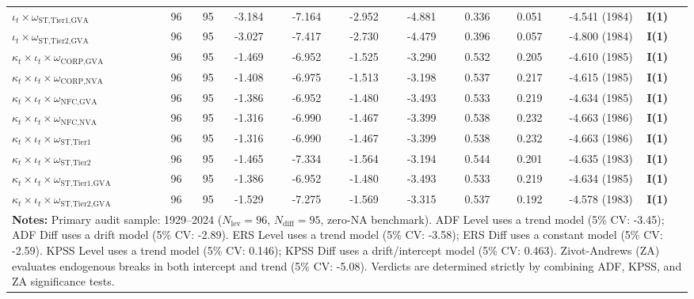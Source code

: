 \documentclass[11pt,a4paper]{article}
\begin{document}
\begin{landscape}
\begin{table}[p]
\begin{tabular}{p{6.0cm} p{0.6cm} p{0.6cm} p{1.5cm} p{1.5cm} p{1.5cm} p{1.5cm} p{1.5cm} p{1.5cm} p{2.2cm} p{2.2cm}}
$\iota_t \times \omega_{\text{ST,Tier1,GVA}}$ & 96 & 95 & -3.184 & -7.164 & -2.952 & -4.881 & 0.336 & 0.051 & -4.541 (1984) & \textbf{I(1)} \\
$\iota_t \times \omega_{\text{ST,Tier2,GVA}}$ & 96 & 95 & -3.027 & -7.417 & -2.730 & -4.479 & 0.396 & 0.057 & -4.800 (1984) & \textbf{I(1)} \\
$\kappa_t \times \iota_t \times \omega_{\text{CORP,GVA}}$ & 96 & 95 & -1.469 & -6.952 & -1.525 & -3.290 & 0.532 & 0.205 & -4.610 (1985) & \textbf{I(1)} \\
$\kappa_t \times \iota_t \times \omega_{\text{CORP,NVA}}$ & 96 & 95 & -1.408 & -6.975 & -1.513 & -3.198 & 0.537 & 0.217 & -4.615 (1985) & \textbf{I(1)} \\
$\kappa_t \times \iota_t \times \omega_{\text{NFC,GVA}}$ & 96 & 95 & -1.386 & -6.952 & -1.480 & -3.493 & 0.533 & 0.219 & -4.634 (1985) & \textbf{I(1)} \\
$\kappa_t \times \iota_t \times \omega_{\text{NFC,NVA}}$ & 96 & 95 & -1.316 & -6.990 & -1.467 & -3.399 & 0.538 & 0.232 & -4.663 (1986) & \textbf{I(1)} \\
$\kappa_t \times \iota_t \times \omega_{\text{ST,Tier1}}$ & 96 & 95 & -1.316 & -6.990 & -1.467 & -3.399 & 0.538 & 0.232 & -4.663 (1986) & \textbf{I(1)} \\
$\kappa_t \times \iota_t \times \omega_{\text{ST,Tier2}}$ & 96 & 95 & -1.465 & -7.334 & -1.564 & -3.194 & 0.544 & 0.201 & -4.635 (1983) & \textbf{I(1)} \\
$\kappa_t \times \iota_t \times \omega_{\text{ST,Tier1,GVA}}$ & 96 & 95 & -1.386 & -6.952 & -1.480 & -3.493 & 0.533 & 0.219 & -4.634 (1985) & \textbf{I(1)} \\
$\kappa_t \times \iota_t \times \omega_{\text{ST,Tier2,GVA}}$ & 96 & 95 & -1.529 & -7.275 & -1.569 & -3.315 & 0.537 & 0.192 & -4.578 (1983) & \textbf{I(1)} \\
\bottomrule
\multicolumn{11}{p{23.0cm}}{\footnotesize \textbf{Notes:} Primary audit sample: 1929--2024 ($N_{\text{lev}}=96$, $N_{\text{diff}}=95$, zero-NA benchmark). ADF Level uses a trend model (5\% CV: -3.45); ADF Diff uses a drift model (5\% CV: -2.89). ERS Level uses a trend model (5\% CV: -3.58); ERS Diff uses a constant model (5\% CV: -2.59). KPSS Level uses a trend model (5\% CV: 0.146); KPSS Diff uses a drift/intercept model (5\% CV: 0.463). Zivot-Andrews (ZA) evaluates endogenous breaks in both intercept and trend (5\% CV: -5.08). Verdicts are determined strictly by combining ADF, KPSS, and ZA significance tests.}
\end{tabular}
\end{table}
\end{landscape}
\end{document}
